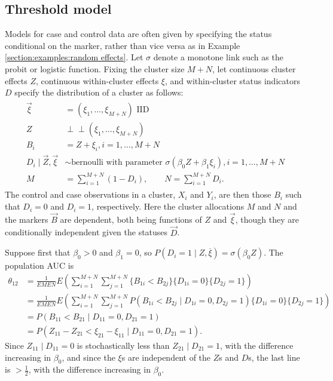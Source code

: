 \documentclass[12pt]{article}
\DeclareMathOperator{\AUC}{AUC}
\newcommand{\E}{E}
\renewcommand{\P}{P}
\newcommand{\cind}{\perp \!\!\! \perp}
\newcommand{\aucpop}{\theta_{12}}%
\begin{document}
\subsection{Threshold model}\label{section:examples:threshold}
Models for case and control data are often given by specifying the
status conditional on the marker, rather than vice versa as in
Example \ref{section:examples:random effects}. Let $\sigma$ denote a monotone link such as the probit or logistic function. Fixing the cluster size $M+N$, let continuous cluster
effects $Z$, continuous within-cluster effects $\xi$, and within-cluster
 status indicators $D$ specify the distribution of a cluster as follows:
\begin{gather}
  \begin{aligned}
    \vec{\xi}&=(\xi_1,\ldots,\xi_{M+N})\text{ IID}\\
    Z &\cind (\xi_1,\ldots,\xi_{M+N}) \\
    B_i &= Z+\xi_i,i=1,\ldots,M+N\\
    D_i \mid \vec{Z},\vec{\xi} &\sim \text{bernoulli with parameter } \sigma(\beta_0 Z+\beta_1\xi_i),i=1,\ldots,M+N\\
    M &= \sum_{i=1}^{M+N} (1-D_i),\qquad     N = \sum_{i=1}^{M+N} D_i.
    \label{model:logistic}
\end{aligned}
\end{gather}
The control and case observations in a cluster, $X_i$ and $Y_i$, are then those $B_i$ such that $D_i=0$ and $D_i=1$, respectively. Here the cluster allocations $M$ and $N$ and the markers $\vec{B}$ are dependent, both being functions of $Z$ and $\vec{\xi}$, though they are conditionally independent given the statuses $\vec{D}$.

Suppose first that $\beta_0>0$ and $\beta_1=0$, so $\P(D_i=1\mid  Z,\overline \xi)=\sigma(\beta_0 Z)$. The population AUC is
\begin{align}
  \aucpop &=\frac{1}{\E M \E N}\E\left(\sum_{i=1}^{M+N}\sum_{j=1}^{M+N}\{B_{1i}<B_{2j}\}\{D_{1i}=0\}\{D_{2j}=1\}\right)\\
	&=\frac{1}{\E M \E N}\E\left(\sum_{i=1}^{M+N}\sum_{j=1}^{M+N}\P(B_{1i}<B_{2j}\mid D_{1i}=0, D_{2j}=1)\{D_{1i}=0\}\{D_{2j}=1\}\right)\\
	&= \P(B_{11}<B_{21}\mid D_{11}=0, D_{21}=1)\\
	&=\P(Z_{11}-Z_{21} < \xi_{21}-\xi_{11}\mid D_{11}=0, D_{21}=1).
\end{align}
Since $Z_{11}\mid D_{11}=0$ is stochastically less than $Z_{21}\mid D_{21}=1$, with the difference increasing in $\beta_0$, and since the $\xi$s are independent of the $Z$s and $D$s, the last line is $>\frac12$, with the difference increasing in $\beta_0$.
\end{document}
